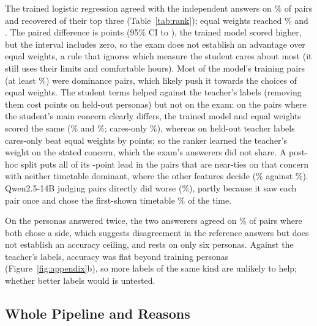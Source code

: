 The trained logistic regression agreed with the independent answers on \rLR\% of pairs and recovered \rLRTop{} of their top three (Table~\ref{tab:rank}); equal weights reached \rEq\% and \rEqTop. The paired difference is \rDiffEq{} points (95\% CI \rDiffEqLo{} to \rDiffEqHi), the trained model scored higher, but the interval includes zero, so the exam does not establish an advantage over equal weights, a rule that ignores which measure the student cares about most (it still uses their limits and comfortable hours). Most of the model's training pairs (at least \rDomShare\%) were dominance pairs, which likely push it towards the choices of equal weights. The student terms helped against the teacher's labels (removing them cost \rAblInteraction{} points on \sTestPersonas{} held-out personas) but not on the exam: on the \rExamClearN{} pairs where the student's main concern clearly differs, the trained model and equal weights scored the same (\rExamClearLR\% and \rExamClearEq\%; cares-only \rExamClearCares\%), whereas on held-out teacher labels cares-only beat equal weights by \rHeldCareGap{} points; so the ranker learned the teacher's weight on the stated concern, which the exam's answerers did not share. A post-hoc split puts all of its \rDiffEq-point lead in the \rExamNearN{} pairs that are near-ties on that concern with neither timetable dominant, where the other features decide (\rExamNearLR\% against \rExamNearEq\%). Qwen2.5-14B judging pairs directly did worse (\rQwen\%), partly because it saw each pair once and chose the first-shown timetable \rQwenFirst\% of the time.

On the \rAgreePersonas{} personas answered twice, the two answerers agreed on \rAgree\% of pairs where both chose a side, which suggests disagreement in the reference answers but does not establish an accuracy ceiling, and rests on only six personas. Against the teacher's labels, accuracy was flat beyond \rDeployPersonas{} training personas (Figure~\ref{fig:appendix}b), so more labels of the same kind are unlikely to help; whether better labels would is untested.

\subsection{Whole Pipeline and Reasons}\label{sec:res-pipeline}

